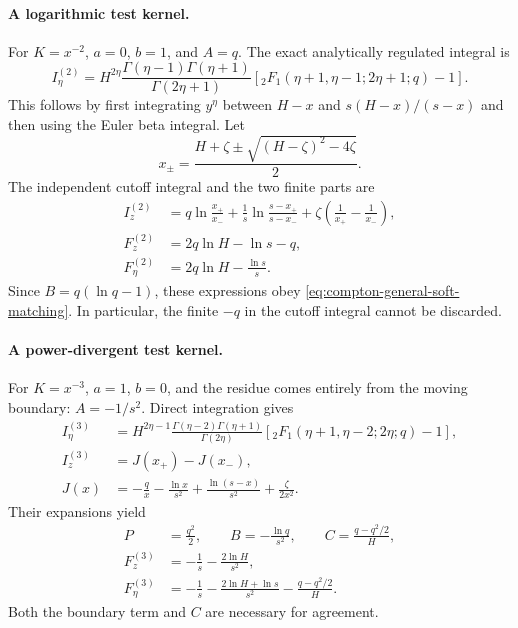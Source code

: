 \paragraph{A logarithmic test kernel.}
For $K=x^{-2}$, $a=0$, $b=1$, and $A=q$.  The exact analytically regulated integral is
\begin{equation}
 I_\eta^{(2)}=
 H^{2\eta}\frac{\Gamma(\eta-1)\Gamma(\eta+1)}{\Gamma(2\eta+1)}
 \left[{}_2F_1(\eta+1,\eta-1;2\eta+1;q)-1\right].
\end{equation}
This follows by first integrating $y^\eta$ between
$H-x$ and $s(H-x)/(s-x)$ and then using the Euler beta integral.
Let
\begin{equation}
 x_\pm=\frac{H+\zeta\pm\sqrt{(H-\zeta)^2-4\zeta}}{2}.
\end{equation}
The independent cutoff integral and the two finite parts are
\begin{align}
 I_z^{(2)}&=q\ln\frac{x_+}{x_-}
 +\frac{1}{s}\ln\frac{s-x_+}{s-x_-}
 +\zeta\left(\frac{1}{x_+}-\frac{1}{x_-}\right),\\
 F_z^{(2)}&=2q\ln H-\ln s-q,\\
 F_\eta^{(2)}&=2q\ln H-\frac{\ln s}{s}.
\end{align}
Since $B=q(\ln q-1)$, these expressions obey
\eqref{eq:compton-general-soft-matching}.  In particular, the finite
$-q$ in the cutoff integral cannot be discarded.

\paragraph{A power-divergent test kernel.}
For $K=x^{-3}$, $a=1$, $b=0$, and the residue comes entirely from the
moving boundary: $A=-1/s^2$.  Direct integration gives
\begin{align}
 I_\eta^{(3)}&=
 H^{2\eta-1}\frac{\Gamma(\eta-2)\Gamma(\eta+1)}{\Gamma(2\eta)}
 \left[{}_2F_1(\eta+1,\eta-2;2\eta;q)-1\right],\\
 I_z^{(3)}&=J(x_+)-J(x_-),\\
 J(x)&=-\frac{q}{x}-\frac{\ln x}{s^2}
 +\frac{\ln(s-x)}{s^2}+\frac{\zeta}{2x^2}.
\end{align}
Their expansions yield
\begin{align}
 P&=\frac{q^2}{2},\qquad B=-\frac{\ln q}{s^2},\qquad
 C=\frac{q-q^2/2}{H},\\
 F_z^{(3)}&=-\frac{1}{s}-\frac{2\ln H}{s^2},\\
 F_\eta^{(3)}&=-\frac{1}{s}-\frac{2\ln H+\ln s}{s^2}
 -\frac{q-q^2/2}{H}.
\end{align}
Both the boundary term and $C$ are necessary for agreement.

